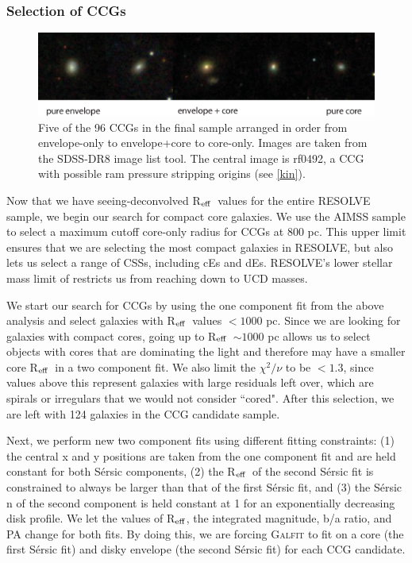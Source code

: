 \documentclass[iop,apj]{emulateapj}
\newcommand{\Reff}{R$_{\rm eff}$}
\begin{document}
\subsubsection{Selection of CCGs}
\label{CCGs}

\begin{figure}[t]
\begin{center}
\includegraphics{CCGpics.eps}
\caption{Five of the 96 CCGs in the final sample arranged in order from envelope-only to envelope+core to core-only. Images are taken from the SDSS-DR8 image list tool. The central image is rf0492, a CCG with possible ram pressure stripping origins (see \autoref{kin}).}
\label{fig:pics}
\end{center}
\end{figure}

\noindent Now that we have seeing-deconvolved \Reff\ values for the entire RESOLVE sample, we begin our search for compact core galaxies. We use the AIMSS sample to select a maximum cutoff core-only radius for CCGs at 800 pc. This upper limit ensures that we are selecting the most compact galaxies in RESOLVE, but also lets us select a range of CSSs, including cEs and dEs. RESOLVE's lower stellar mass limit of  restricts us from reaching down to UCD masses.

We start our search for CCGs by using the one component fit from the above analysis and select galaxies with \Reff\ values $<1000$ pc. Since we are looking for galaxies with compact cores, going up to \Reff\ $\sim 1000$ pc allows us to select objects with cores that are dominating the light and therefore may have a smaller core \Reff\ in a two component fit. We also limit the  $\chi^2/\nu$ to be $<1.3$, since values above this represent galaxies with large residuals left over, which are spirals or irregulars that we would not consider ``cored". After this selection, we are left with 124 galaxies in the CCG candidate sample.

Next, we perform new two component fits using different fitting constraints: (1) the central x and y positions are taken from the one component fit and are held constant for both S\'ersic components, (2) the \Reff\ of the second S\'ersic fit is constrained to always be larger than that of the first S\'ersic fit, and (3) the S\'ersic n of the second component is held constant at 1 for an exponentially decreasing disk profile. We let the values of \Reff, the integrated magnitude, b/a ratio, and PA change for both fits. By doing this, we are forcing \textsc{Galfit} to fit on a core (the first S\'ersic fit) and disky envelope (the second S\'ersic fit) for each CCG candidate.
\end{document}
